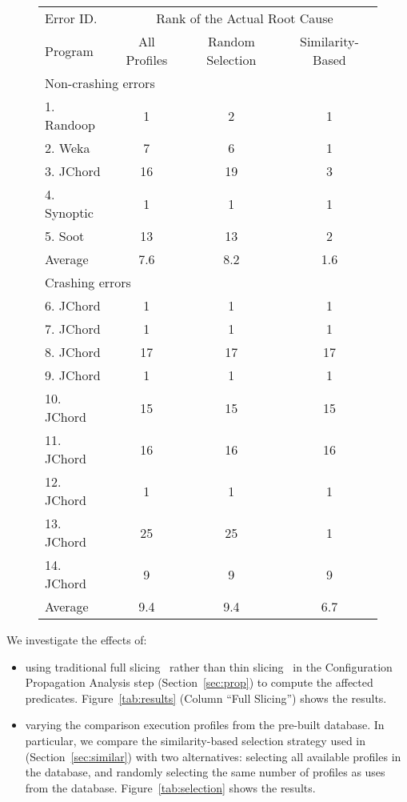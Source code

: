 \begin{figure}[t]
\setlength{\tabcolsep}{.74\tabcolsep}
\small{
\begin{tabular}{|l|c|c||c|}
\hline
 Error ID. & \multicolumn{3}{|c|}{Rank of the Actual Root Cause} \\
\cline{2-4}
 Program & All Profiles& Random Selection&  Similarity-Based\\
 \hline
\hline
\multicolumn{4}{|l|}{Non-crashing errors}   \\
 \hline
 1. Randoop & 1 & 2 & 1\\
 2. Weka & 7 & 6 & 1\\
 3. JChord & 16 & 19 & 3\\
 4. Synoptic & 1 & 1 & 1\\
 5. Soot & 13 & 13 & 2\\
\hline
Average & 7.6 & 8.2 & 1.6 \\
\hline
\hline
\multicolumn{4}{|l|}{Crashing errors}   \\
\hline
 6. JChord & 1 & 1 &1\\
 7. JChord & 1 & 1 &1\\
 8. JChord & 17 & 17 &17\\
 9. JChord & 1 &  1&1\\
 10. JChord & 15 & 15 &15\\
 11. JChord & 16 & 16 &16\\
 12. JChord & 1 & 1 &1\\
 13. JChord & 25 & 25 &1\\
 14. JChord & 9 & 9 &9\\
\hline
Average & 9.4 & 9.4 & 6.7\\
\hline
\end{tabular}
}
\end{figure}

We investigate the effects of:

\begin{itemize}
\item using traditional full slicing~\cite{Horwitz:1988} rather
than thin slicing~\cite{Sridharan:2007} in the Configuration
Propagation Analysis step (Section~\ref{sec:prop}) to compute the affected predicates.
Figure~\ref{tab:results}  (Column ``Full Slicing'') shows the results.
\item varying the comparison execution profiles from the pre-built database.
In particular, we compare the similarity-based selection strategy used in \ourtool
 (Section~\ref{sec:similar}) with two alternatives: selecting
all available profiles in the database, and
randomly selecting the same number of profiles as \ourtool uses from the database.
Figure~\ref{tab:selection} shows the results.
\end{itemize}


